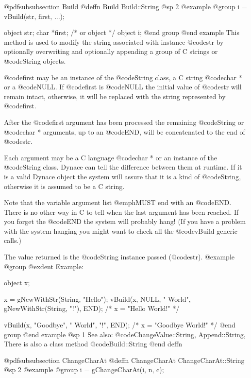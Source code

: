 @pdfsubsubsection {Build}
@deffn {Build} Build::String
@sp 2
@example
@group
i = vBuild(str, first, ...);

object  str;
char    *first;  /*  or object  */
object  i;
@end group
@end example
This method is used to modify the string associated with instance @code{str}
by optionally overwriting and optionally appending a group of C strings or
@code{String} objects.

@code{first} may be an instance of the @code{String} class, a C string
@code{char *} or a @code{NULL}.  If @code{first} is @code{NULL} the initial
value of @code{str} will remain intact, otherwise, it will be replaced
with the string represented by @code{first}.

After the @code{first} argument has been processed the remaining
@code{String} or @code{char *} arguments, up to an @code{END}, 
will be concatenated to the end of @code{str}.

Each argument may be a C language @code{char *} or an instance of the
@code{String} class.  Dynace can tell the difference between them at
runtime.  If it is a valid Dynace object the system will assure that it is
a kind of @code{String}, otherwise it is assumed to be a C string.

Note that the variable argument list @emph{MUST} end with an @code{END}.
There is no other way in C to tell when the last argument has been reached.
If you forget the @code{END} the system will probably hang!  (If you
have a problem with the system hanging you might want to check all the
@code{vBuild} generic calls.)

The value returned is the @code{String} instance passed (@code{str}).
@example
@group
@exdent Example:

object  x;

x = gNewWithStr(String, "Hello");
vBuild(x, NULL, " World", gNewWithStr(String, "!"), END);
/*  x = "Hello World!"  */

vBuild(x, "Goodbye", " World", "!", END);
/*  x = "Goodbye World!"  */
@end group
@end example
@sp 1
See also:  @code{ChangeValue::String, Append::String,}
There is also a class method @code{Build::String}
@end deffn












@pdfsubsubsection {ChangeCharAt}
@deffn {ChangeCharAt} ChangeCharAt::String
@sp 2
@example
@group
i = gChangeCharAt(i, n, c);


